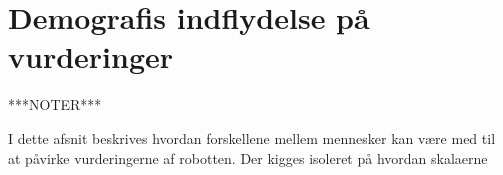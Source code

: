 \section{Demografis indflydelse på vurderinger}
\label{sec:Demografi}
%
***NOTER***

I dette afsnit beskrives hvordan forskellene mellem mennesker kan være med til at påvirke vurderingerne af robotten. Der kigges isoleret på hvordan skalaerne 